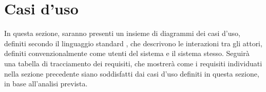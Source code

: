 \section{Casi d'uso}

In questa sezione, saranno presenti un insieme di diagrammi dei casi d'uso, definiti secondo il linguaggio standard ,
che descrivono le interazioni tra gli attori, definiti convenzionalmente come utenti del sistema e il sistema stesso. 
Seguirà una tabella di tracciamento dei requisiti, che mostrerà come i requisiti individuati nella sezione precedente siano soddisfatti
dai casi d'uso definiti in questa sezione, in base all'analisi prevista. \\
\\

%
%
%
